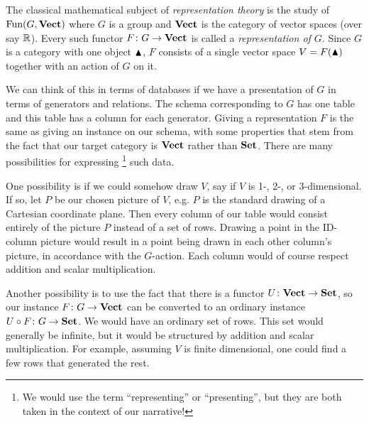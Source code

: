 \documentclass[CT4S-EN-RU]{subfiles}
\begin{document}

\subsection{}


\subsubsection{}\label{ex:reps of groups}

The classical mathematical subject of {\em representation theory} is the study of $\textnormal{Fun}(G,{\bf Vect})$ where $G$ is a group and ${\bf Vect}$ is the category of vector spaces (over say ${\mathbb R}$). Every such functor $F\colon G\rightarrow{\bf Vect}$ is called a {\em representation of $G$}. Since $G$ is a category with one object $\blacktriangle$, $F$ consists of a single vector space $V=F(\blacktriangle)$ together with an action of $G$ on it. 

We can think of this in terms of databases if we have a presentation of $G$ in terms of generators and relations. The schema corresponding to $G$ has one table and this table has a column for each generator. Giving a representation $F$ is the same as giving an instance on our schema, with some properties that stem from the fact that our target category is ${\bf Vect}$ rather than ${\bf Set}$. There are many possibilities for expressing
\footnote{We would use the term “representing” or “presenting”, but they are both taken in the context of our narrative!}
such data.

One possibility is if we could somehow draw $V$, say if $V$ is 1-, 2-, or 3-dimensional. If so, let $P$ be our chosen picture of $V$, e.g. $P$ is the standard drawing of a Cartesian coordinate plane. Then every column of our table would consist entirely of the picture $P$ instead of a set of rows. Drawing a point in the ID-column picture would result in a point being drawn in each other column's picture, in accordance with the $G$-action. Each column would of course respect addition and scalar multiplication.

Another possibility is to use the fact that there is a functor $U\colon{\bf Vect}\rightarrow{\bf Set}$, so our instance $F\colon G\rightarrow{\bf Vect}$ can be converted to an ordinary instance $U\circ F\colon G\rightarrow{\bf Set}$. We would have an ordinary set of rows. This set would generally be infinite, but it would be structured by addition and scalar multiplication. For example, assuming $V$ is finite dimensional, one could find a few rows that generated the rest. 
\end{document}
